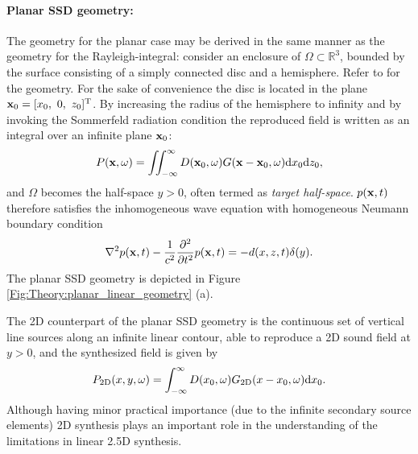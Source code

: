 \paragraph{Planar SSD geometry:}
The geometry for the planar case may be derived in the same manner as the geometry for the Rayleigh-integral: consider an enclosure of $\Omega \subset \mathbb{R}^3$, bounded by the surface consisting of a simply connected disc and a hemisphere. Refer to \cite[p.~84,p.~275]{Ahrens2012, Williams1999} for the geometry. For the sake of convenience the disc is located in the plane $\mathbf{x}_0 = [x_0,\ 0,\ z_0]^{\mathrm{T}}$. By increasing the radius of the hemisphere to infinity and by invoking the Sommerfeld radiation condition the reproduced field is written as an integral over an infinite plane $\mathbf{x}_0$:
\begin{equation}
P(\mathbf{x},\omega) = \iint_{-\infty}^{\infty} D(\mathbf{x}_0,\omega) G(\mathbf{x} - \mathbf{x}_0 , \omega ) \mathrm{d} x_0 \mathrm{d} z_0,
\label{Eq:Theory:3D_planar_SFS}
\end{equation}
and $\Omega$ becomes the half-space $y>0$, often termed as \emph{target half-space}.
$p(\mathbf{x},t)$ therefore satisfies the inhomogeneous wave equation with homogeneous Neumann boundary condition
\begin{equation}
\nabla^2 p(\mathbf{x},t) - \frac{1}{c^2}\frac{\partial^2}{\partial t^2} p(\mathbf{x},t) = - d(x,z,t)\delta(y).
\label{Eq:Theory:3D_planar_SFS_time}
\end{equation}
The planar SSD geometry is depicted in Figure \ref{Fig:Theory:planar_linear_geometry} (a).

The 2D counterpart of the planar SSD geometry is the continuous set of vertical line sources along an infinite linear contour, able to reproduce a 2D sound field at $y>0$, and the synthesized field is given by
\begin{equation}
P_{2\mathrm{D}}(x,y,\omega) =  
\int_{-\infty}^{\infty} D(x_0,\omega) G_{2\mathrm{D}}(x - x_0 , \omega ) \mathrm{d} x_0.
\label{Eq:Theory:2D_planar_SFS}
\end{equation}
Although having minor practical importance (due to the infinite secondary source elements) 2D synthesis plays an important role in the understanding of the limitations in linear 2.5D synthesis.


